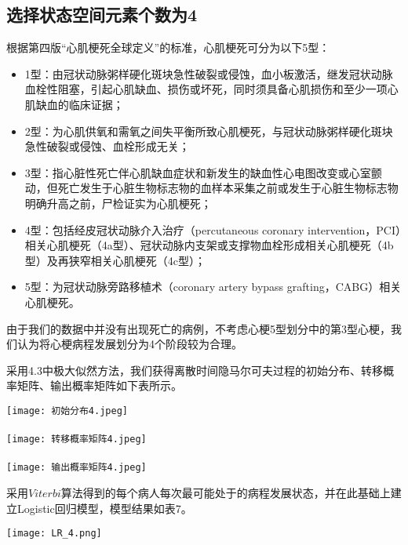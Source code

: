 \documentclass{article}
\begin{document}
\subsection{选择状态空间元素个数为4}
根据第四版“心肌梗死全球定义”的标准，心肌梗死可分为以下5型：
\begin{itemize}
    \item 1型：由冠状动脉粥样硬化斑块急性破裂或侵蚀，血小板激活，继发冠状动脉血栓性阻塞，引起心肌缺血、损伤或坏死，同时须具备心肌损伤和至少一项心肌缺血的临床证据；
    \item 2型：为心肌供氧和需氧之间失平衡所致心肌梗死，与冠状动脉粥样硬化斑块急性破裂或侵蚀、血栓形成无关；
    \item 3型：指心脏性死亡伴心肌缺血症状和新发生的缺血性心电图改变或心室颤动，但死亡发生于心脏生物标志物的血样本采集之前或发生于心脏生物标志物明确升高之前，尸检证实为心肌梗死；
    \item 4型：包括经皮冠状动脉介入治疗（percutaneous coronary intervention，PCI）相关心肌梗死（4a型）、冠状动脉内支架或支撑物血栓形成相关心肌梗死（4b型）及再狭窄相关心肌梗死（4c型）；
    \item 5型：为冠状动脉旁路移植术（coronary artery bypass grafting，CABG）相关心肌梗死。
\end{itemize}

由于我们的数据中并没有出现死亡的病例，不考虑心梗5型划分中的第3型心梗，我们认为将心梗病程发展划分为4个阶段较为合理。

采用4.3中极大似然方法，我们获得离散时间隐马尔可夫过程的初始分布、转移概率矩阵、输出概率矩阵如下表所示。
\begin{center}
\texttt{[image: 初始分布4.jpeg]}\\
\\
\texttt{[image: 转移概率矩阵4.jpeg]}\\
\\
\texttt{[image: 输出概率矩阵4.jpeg]}\\
\end{center}

采用$Viterbi$算法得到的每个病人每次最可能处于的病程发展状态，并在此基础上建立Logistic回归模型，模型结果如表7。

\begin{center}
\texttt{[image: LR\_4.png]}\\
\\
\end{center}
\end{document}
